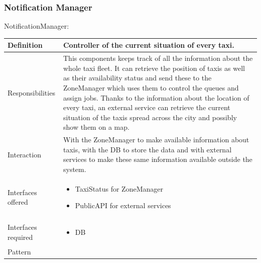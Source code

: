 \documentclass[a4paper,11pt]{report} %
\begin{document}
	\subsubsection{Notification Manager}
	\begin{minipage}{\linewidth}
	\end{minipage} \linebreak
	\centerline{NotificationManager:}
	\begin{center}
		\begin{tabular}{| l | p{9cm} |}\hline
			Definition & Controller of the current situation of every taxi.\\\hline
			Responsibilities & This components keeps track of all the information about the whole taxi fleet. It can retrieve the position of taxis as well as their availability status and send these to the ZoneManager which uses them to control the queues and assign jobs. Thanks to the information about the location of every taxi, an external service can retrieve the current situation of the taxis spread across the city and possibly show them on a map.\\\hline
			Interaction & With the ZoneManager to make available information about taxis, with the DB to store the data and with external services to make these same information available outside the system.\\\hline
			Interfaces offered & \begin{itemize}
				\item TaxiStatus for ZoneManager
				\item PublicAPI for external services
			\end{itemize}\\\hline
			Interfaces required & \begin{itemize}
				\item DB
			\end{itemize}\\\hline
			Pattern & \\\hline
		\end{tabular}
	\end{center}	
	
\end{document}
